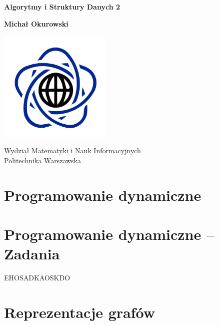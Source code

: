 



\begin{titlepage}
    \begin{center}
        \vspace*{1cm}

        \Huge

        \textbf{Algorytmy i Struktury Danych 2}

        \vspace{1.5cm}

        \LARGE

        \textbf{Michał Okurowski}

        \vfill  

        \vspace{0.8cm}

        \includegraphics[width=0.4\textwidth]{data/university.png}

        Wydział Matematyki i Nauk Informacyjnych\\
        Politechnika Warszawska\\
    \end{center}
\end{titlepage}

\tableofcontents
\pagebreak

\section{Programowanie dynamiczne}

\section{Programowanie dynamiczne -- Zadania}

EHOSADKAOSKDO
\section{Reprezentacje grafów}

